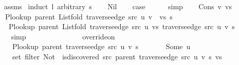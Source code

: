 \begin{isabellebody}
%
\isadelimproof
\ \ %
\endisadelimproof
%
\isatagproof
{}\isamarkupfalse%
\ assms\isanewline
{}\isamarkupfalse%
\ {\isacharparenleft}{\kern0pt}induct\ l\ arbitrary{\isacharcolon}{\kern0pt}\ s{\isacharparenright}{\kern0pt}\isanewline
\ \ \isamarkupfalse%
\ Nil\isanewline
\ \ \isamarkupfalse%
\ {\isacharquery}{\kern0pt}case\isanewline
\ \ \ \ \isamarkupfalse%
\ simp\isanewline
{}\isamarkupfalse%
\isanewline
\ \ \isamarkupfalse%
\ {\isacharparenleft}{\kern0pt}Cons\ v\ vs{\isacharparenright}{\kern0pt}\isanewline
\ \ \isamarkupfalse%
\isanewline
\ \ \ \ {\isachardoublequoteopen}P{\isacharunderscore}{\kern0pt}lookup\ {\isacharparenleft}{\kern0pt}parent\ {\isacharparenleft}{\kern0pt}List{\isachardot}{\kern0pt}fold\ {\isacharparenleft}{\kern0pt}traverse{\isacharunderscore}{\kern0pt}edge\ src\ u{\isacharparenright}{\kern0pt}\ {\isacharparenleft}{\kern0pt}v\ {\isacharhash}{\kern0pt}\ vs{\isacharparenright}{\kern0pt}\ s{\isacharparenright}{\kern0pt}{\isacharparenright}{\kern0pt}\ {\isacharequal}{\kern0pt}\isanewline
\ \ \ \ \ P{\isacharunderscore}{\kern0pt}lookup\ {\isacharparenleft}{\kern0pt}parent\ {\isacharparenleft}{\kern0pt}List{\isachardot}{\kern0pt}fold\ {\isacharparenleft}{\kern0pt}traverse{\isacharunderscore}{\kern0pt}edge\ src\ u{\isacharparenright}{\kern0pt}\ vs\ {\isacharparenleft}{\kern0pt}traverse{\isacharunderscore}{\kern0pt}edge\ src\ u\ v\ s{\isacharparenright}{\kern0pt}{\isacharparenright}{\kern0pt}{\isacharparenright}{\kern0pt}{\isachardoublequoteclose}\isanewline
\ \ \ \ \isamarkupfalse%
\ simp\isanewline
\ \ \isamarkupfalse%
\ \isamarkupfalse%
\isanewline
\ \ \ \ {\isachardoublequoteopen}{\isachardot}{\kern0pt}{\isachardot}{\kern0pt}{\isachardot}{\kern0pt}\ {\isacharequal}{\kern0pt}\isanewline
\ \ \ \ \ override{\isacharunderscore}{\kern0pt}on\isanewline
\ \ \ \ \ \ {\isacharparenleft}{\kern0pt}P{\isacharunderscore}{\kern0pt}lookup\ {\isacharparenleft}{\kern0pt}parent\ {\isacharparenleft}{\kern0pt}traverse{\isacharunderscore}{\kern0pt}edge\ src\ u\ v\ s{\isacharparenright}{\kern0pt}{\isacharparenright}{\kern0pt}{\isacharparenright}{\kern0pt}\isanewline
\ \ \ \ \ \ {\isacharparenleft}{\kern0pt}{\isasymlambda}{\isacharunderscore}{\kern0pt}{\isachardot}{\kern0pt}\ Some\ u{\isacharparenright}{\kern0pt}\isanewline
\ \ \ \ \ \ {\isacharparenleft}{\kern0pt}set\ {\isacharparenleft}{\kern0pt}filter\ {\isacharparenleft}{\kern0pt}Not\ {\isasymcirc}\ is{\isacharunderscore}{\kern0pt}discovered\ src\ {\isacharparenleft}{\kern0pt}parent\ {\isacharparenleft}{\kern0pt}traverse{\isacharunderscore}{\kern0pt}edge\ src\ u\ v\ s{\isacharparenright}{\kern0pt}{\isacharparenright}{\kern0pt}{\isacharparenright}{\kern0pt}\ vs{\isacharparenright}{\kern0pt}{\isacharparenright}{\kern0pt}{\isachardoublequoteclose}\isanewline

\end{isabellebody}
